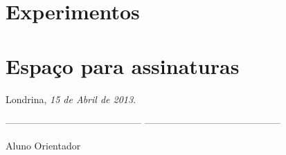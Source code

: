 \documentclass[12pt]{article}
\begin{document}
\section{Experimentos}
\label{sec:experimentos}

\section {Espaço para assinaturas}


\vspace{1cm}

\hfill Londrina, \textit{15 de Abril de 2013}.


\vspace{1cm}
\noindent
------------------------------------------ \hfill ------------------------------------------

\hspace{1cm} Aluno \hspace{8cm} Orientador

\end{document}
